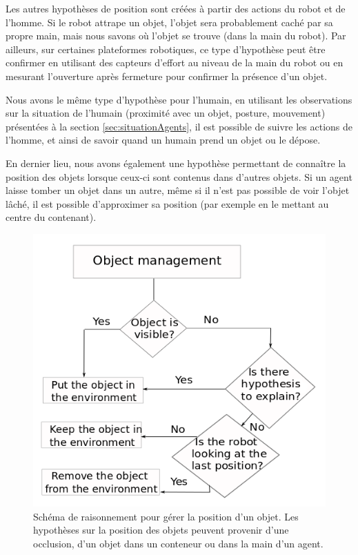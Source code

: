 \documentclass[a4paper,11pt,twoside]{StyleThese}
\begin{document}
Les autres hypothèses de position sont créées à partir des actions du robot et de l'homme. Si le robot attrape un objet, l'objet sera probablement caché par sa propre main, mais nous savons où l'objet se trouve (dans la main du robot). Par ailleurs, sur certaines plateformes robotiques, ce type d'hypothèse peut être confirmer en utilisant des capteurs d'effort au niveau de la main du robot ou en mesurant l'ouverture après fermeture pour confirmer la présence d'un objet.

Nous avons le même type d'hypothèse pour l'humain, en utilisant les observations sur la situation de l'humain (proximité avec un objet, posture, mouvement) présentées à la section \ref{sec:situationAgents}, il est possible de suivre les actions de l'homme, et ainsi de savoir quand un humain prend un objet ou le dépose.

En dernier lieu, nous avons également une hypothèse permettant de connaître la position des objets lorsque ceux-ci sont contenus dans d'autres objets.
Si un agent laisse tomber un objet dans un autre, même si il n'est pas possible de voir l'objet lâché, il est possible d'approximer sa position (par exemple en le mettant au centre du contenant).

\begin{figure}[ht!]
 \centering
  \includegraphics[width=0.70\linewidth]{./img/hypothesis.png} 
  \caption {Schéma de raisonnement pour gérer la position d'un objet. Les hypothèses sur la position des objets peuvent provenir d'une occlusion, d'un objet dans un conteneur ou dans la main d'un agent.}
  \label{obj_manag_fg}
\end{figure}
\end{document}
